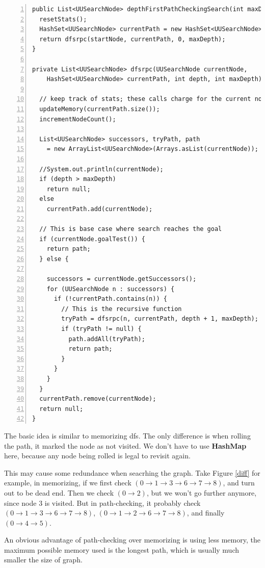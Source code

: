 \documentclass{article}
\begin{document}
\begin{lstlisting}[numbers=left]
public List<UUSearchNode> depthFirstPathCheckingSearch(int maxDepth) {
  resetStats();
  HashSet<UUSearchNode> currentPath = new HashSet<UUSearchNode>();
  return dfsrpc(startNode, currentPath, 0, maxDepth);
}

private List<UUSearchNode> dfsrpc(UUSearchNode currentNode,
    HashSet<UUSearchNode> currentPath, int depth, int maxDepth) {

  // keep track of stats; these calls charge for the current node
  updateMemory(currentPath.size());
  incrementNodeCount();

  List<UUSearchNode> successors, tryPath, path 
  	= new ArrayList<UUSearchNode>(Arrays.asList(currentNode));

  //System.out.println(currentNode);
  if (depth > maxDepth)
    return null;
  else 
    currentPath.add(currentNode);

  // This is base case where search reaches the goal
  if (currentNode.goalTest()) {
    return path;
  } else {
  
    successors = currentNode.getSuccessors();
    for (UUSearchNode n : successors) {
      if (!currentPath.contains(n)) {
        // This is the recursive function
        tryPath = dfsrpc(n, currentPath, depth + 1, maxDepth);
        if (tryPath != null) {
          path.addAll(tryPath);
          return path;
        }
      }
    }
  }
  currentPath.remove(currentNode);
  return null;
}
\end{lstlisting}

The basic idea is similar to memorizing dfs. The only difference is when rolling the path, it marked the node as not visited. We don't have to use \textbf{HashMap} here, because any node being rolled is legal to revisit again.

This may cause some redundance when seacrhing the graph. Take Figure \ref{diff} for example, in memorizing, if we first check $(0 \rightarrow 1 \rightarrow 3 \rightarrow 6 \rightarrow 7 \rightarrow 8)$, and turn out to be dead end. Then we check $(0 \rightarrow 2)$, but we won't go further anymore, since node $3$ is visited. But in path-checking, it probably check $(0 \rightarrow 1 \rightarrow 3 \rightarrow 6 \rightarrow 7 \rightarrow 8)$, $(0 \rightarrow 1 \rightarrow 2 \rightarrow 6 \rightarrow 7 \rightarrow 8)$, and finally $(0 \rightarrow 4 \rightarrow 5)$.

An obvious advantage of path-checking over memorizing is using less memory, the maximum possible memory used is the longest path, which is usually much smaller the size of graph.
\end{document}
